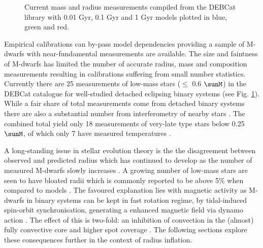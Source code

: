 






\begin{figure}
\centering
\caption{Current mass and radius measurements compiled from the DEBCat library \protect\cite{Southworth2015} with 0.01 Gyr, 0.1 Gyr and 1 Gyr models \protect\cite{BaraffeHomeierAllardEtAl2015} plotted in blue, green and red. }
\label{debplot1}
\end{figure}

Empirical calibrations can by-pass model dependencies providing a sample of M-dwarfs with near-fundamental measurements are available. The size and faintness of M-dwarfs has limited the number of accurate radius, mass and composition measurements resulting in calibrations suffering from small number statistics. Currently there are 25 measurements of low-mass stars ($\leq$ 0.6 $\sunM$) in the DEBCat catalogue \cite{Southworth2015} for well-studied detached eclipsing binary systems (see Fig. \ref{debplot1}). While a fair share of total measurements come from detached binary systems there are also a substantial number from interferometry of nearby stars \cite{Boyajian2012}. The combined total yield only 18 measurements of very-late type stars below 0.25\,$\sunM$, of which only 7 have measured temperatures \cite{GomezMaqueoChew2014}.

A long-standing issue in stellar evolution theory is the the disagreement between observed and predicted radius which has continued to develop as the number of measured M-dwarfs slowly increases \cite{Hoxie1973}. A growing number of low-mass stars are seen to have bloated radii which is commonly reported to be above 5\% when compared to models \cite{Torres2013}. The favoured explanation lies with magnetic activity as M-dwarfs in binary systems can be kept in fast rotation regime, by tidal-induced spin-orbit synchronisation, generating a enhanced magnetic field via dynamo action \cite{Chabrier2007}. The effect of this is two-fold: an inhibition of convection in the (almost) fully convective core and higher spot coverage \cite{GoughTayler1966}. The following sections explore these consequences further in the context of radius inflation. 

